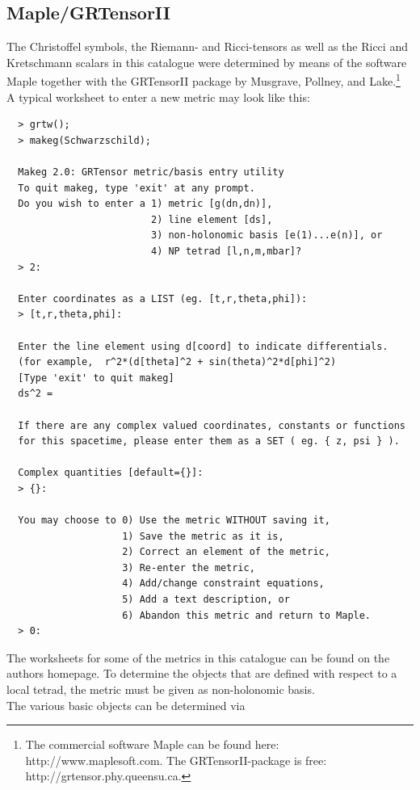 \documentclass[10pt,twoside,notitlepage,a4paper,fleqn,openbib]{report}
\newcommand{\verbfont}{\fontsize{7}{9}\selectfont}
\begin{document}
\subsection{Maple/GRTensorII}
The Christoffel symbols, the Riemann- and Ricci-tensors as well as the Ricci and Kretschmann scalars in this catalogue were determined by means of the software Maple together with the GRTensorII package by Musgrave, Pollney, and Lake.\footnote{The commercial software Maple can be found here: {http://www.maplesoft.com}. The GRTensorII-package is free: {http://grtensor.phy.queensu.ca}.}\\[1em]
A typical worksheet to enter a new metric may look like this:
{\verbfont
\begin{verbatim}
  > grtw();
  > makeg(Schwarzschild);

  Makeg 2.0: GRTensor metric/basis entry utility
  To quit makeg, type 'exit' at any prompt.
  Do you wish to enter a 1) metric [g(dn,dn)],
                         2) line element [ds],
                         3) non-holonomic basis [e(1)...e(n)], or
                         4) NP tetrad [l,n,m,mbar]?
  > 2:

  Enter coordinates as a LIST (eg. [t,r,theta,phi]):
  > [t,r,theta,phi]:

  Enter the line element using d[coord] to indicate differentials.
  (for example,  r^2*(d[theta]^2 + sin(theta)^2*d[phi]^2)
  [Type 'exit' to quit makeg]
  ds^2 = 

  If there are any complex valued coordinates, constants or functions
  for this spacetime, please enter them as a SET ( eg. { z, psi } ).

  Complex quantities [default={}]: 
  > {}:

  You may choose to 0) Use the metric WITHOUT saving it,
                    1) Save the metric as it is,
                    2) Correct an element of the metric,
                    3) Re-enter the metric,
                    4) Add/change constraint equations, 
                    5) Add a text description, or
                    6) Abandon this metric and return to Maple.
  > 0: 
\end{verbatim}
}
The worksheets for some of the metrics in this catalogue can be found on the authors homepage.
To determine the objects that are defined with respect to a local tetrad, the metric must be given as non-holonomic basis.\\
The various basic objects can be determined via
\vspace*{-0.5cm}
\end{document}
